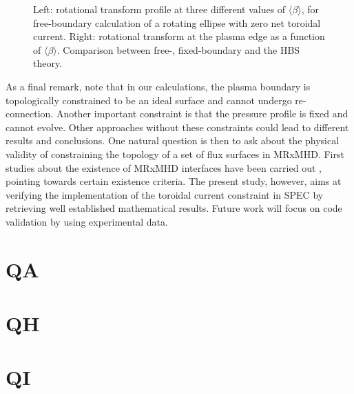 \documentclass[my_thesis.tex]{subfiles}
\begin{document}
\begin{figure}
	\centering
	\hfill
	\hfill
	\hfill
	\caption{Left: rotational transform profile at three different values of $\langle\beta\rangle$, for free-boundary calculation of a rotating ellipse with zero net toroidal current. Right: rotational transform at the plasma edge as a function of $\langle\beta\rangle$. Comparison between free-, fixed-boundary and the \ac{HBS} theory.}
	\label{fig:iota_beta_scan}
\end{figure}


As a final remark, note that in our calculations, the plasma boundary is topologically constrained to be an ideal surface and cannot undergo re-connection. Another important constraint is that the pressure profile is fixed and cannot evolve. Other approaches without these constraints could lead to different results and conclusions. One natural question is then to ask about the physical validity of constraining the topology of a set of flux surfaces in \ac{MRxMHD}. First studies about the existence of \ac{MRxMHD} interfaces have been carried out \citep{McGann2010,Qu2021}, pointing towards certain existence criteria. The present study, however, aims at verifying the implementation of the toroidal current constraint in \ac{SPEC} by retrieving well established mathematical results. Future work will focus on code validation by using experimental data.



\section{QA}

\section{QH}

\section{QI}
\end{document}

